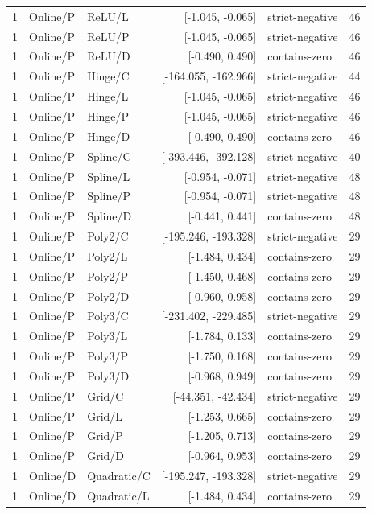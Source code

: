 \begin{longtable}{lllrlr}
1 & Online/P & ReLU/L & [-1.045, -0.065] & strict-negative & 46 \\
1 & Online/P & ReLU/P & [-1.045, -0.065] & strict-negative & 46 \\
1 & Online/P & ReLU/D & [-0.490, 0.490] & contains-zero & 46 \\
1 & Online/P & Hinge/C & [-164.055, -162.966] & strict-negative & 44 \\
1 & Online/P & Hinge/L & [-1.045, -0.065] & strict-negative & 46 \\
1 & Online/P & Hinge/P & [-1.045, -0.065] & strict-negative & 46 \\
1 & Online/P & Hinge/D & [-0.490, 0.490] & contains-zero & 46 \\
1 & Online/P & Spline/C & [-393.446, -392.128] & strict-negative & 40 \\
1 & Online/P & Spline/L & [-0.954, -0.071] & strict-negative & 48 \\
1 & Online/P & Spline/P & [-0.954, -0.071] & strict-negative & 48 \\
1 & Online/P & Spline/D & [-0.441, 0.441] & contains-zero & 48 \\
1 & Online/P & Poly2/C & [-195.246, -193.328] & strict-negative & 29 \\
1 & Online/P & Poly2/L & [-1.484, 0.434] & contains-zero & 29 \\
1 & Online/P & Poly2/P & [-1.450, 0.468] & contains-zero & 29 \\
1 & Online/P & Poly2/D & [-0.960, 0.958] & contains-zero & 29 \\
1 & Online/P & Poly3/C & [-231.402, -229.485] & strict-negative & 29 \\
1 & Online/P & Poly3/L & [-1.784, 0.133] & contains-zero & 29 \\
1 & Online/P & Poly3/P & [-1.750, 0.168] & contains-zero & 29 \\
1 & Online/P & Poly3/D & [-0.968, 0.949] & contains-zero & 29 \\
1 & Online/P & Grid/C & [-44.351, -42.434] & strict-negative & 29 \\
1 & Online/P & Grid/L & [-1.253, 0.665] & contains-zero & 29 \\
1 & Online/P & Grid/P & [-1.205, 0.713] & contains-zero & 29 \\
1 & Online/P & Grid/D & [-0.964, 0.953] & contains-zero & 29 \\
1 & Online/D & Quadratic/C & [-195.247, -193.328] & strict-negative & 29 \\
1 & Online/D & Quadratic/L & [-1.484, 0.434] & contains-zero & 29 \\

\end{longtable}
